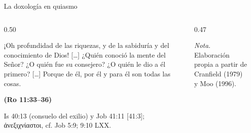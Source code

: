 \documentclass[hyperref={bookmarks=false},aspectratio=169]{beamer}
\newcommand{\grc}[1]{\foreignlanguage{ancientgreek}{#1}}
\newcommand{\fuente}[1]{\par\hfill{\upshape\bfseries\footnotesize\textcolor{ladrillo}{#1}}}
\begin{document}
\begin{frame}{La doxología en quiasmo}
\begin{columns}[c,onlytextwidth]
\begin{column}{0.50\textwidth}
\begin{cita}[fontupper=\scriptsize\itshape]¡Oh profundidad de las riquezas, y de la sabiduría y del conocimiento de Dios! [\ldots] ¿Quién conoció la mente del Señor? ¿O quién fue su consejero? ¿O quién le dio a él primero? [\ldots] Porque de él, por él y para él son todas las cosas.\fuente{(Ro 11:33--36)}\end{cita}
\scriptsize Is 40:13 (consuelo del exilio) y Job 41:11 [41:3]; \grc{ἀνεξιχνίαστοι}, cf. Job 5:9; 9:10 LXX.
\end{column}
\begin{column}{0.47\textwidth}
\centering
{}\par
{\fontsize{5}{6}\selectfont\color{sepia}\hfill\textit{Nota.} Elaboración propia a partir de Cranfield (1979) y Moo (1996).\par}
\end{column}
\end{columns}
\end{frame}

\end{document}
